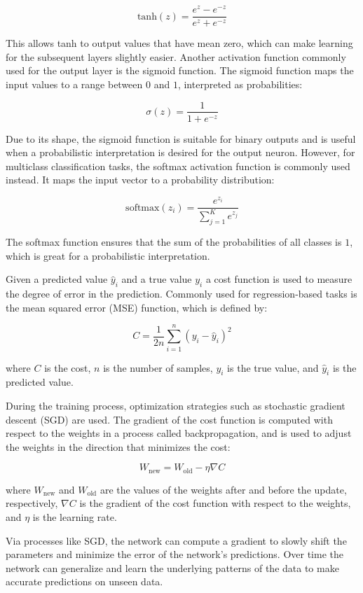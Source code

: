 \documentclass[11pt]{article}
\begin{document}
\[
\text{tanh}(z) = \frac{e^{z} - e^{-z}}{e^{z} + e^{-z}}
\]

This allows tanh to output values that have mean zero, which can make learning for the subsequent layers slightly easier. Another activation function commonly used for the output layer is the sigmoid function. The sigmoid function maps the input values to a range between \(0\) and \(1\), interpreted as probabilities:

\[
\sigma(z) = \frac{1}{1 + e^{-z}}
\]

Due to its shape, the sigmoid function is suitable for binary outputs and is useful when a probabilistic interpretation is desired for the output neuron. However, for multiclass classification tasks, the softmax activation function is commonly used instead. It maps the input vector to a probability distribution:

\[
\text{softmax}(z_i) = \frac{e^{z_i}}{\sum_{j=1}^{K} e^{z_j}}
\]

The softmax function ensures that the sum of the probabilities of all classes is \(1\), which is great for a probabilistic interpretation.

Given a predicted value \(\hat{y}_i\) and a true value \(y_i\) a cost function is used to measure the degree of error in the prediction. Commonly used for regression-based tasks is the mean squared error (MSE) function, which is defined by:

\[ C = \frac{1}{2n} \sum_{i=1}^{n} (y_i - \hat{y}_i)^2 \]

where \(C\) is the cost, \(n\) is the number of samples, \(y_i\) is the true value, and \(\hat{y}_i\) is the predicted value.

During the training process, optimization strategies such as stochastic gradient descent (SGD) are used. The gradient of the cost function is computed with respect to the weights in a process called backpropagation, and is used to adjust the weights in the direction that minimizes the cost:

\[ W_{\text{new}} = W_{\text{old}} - \eta \nabla C \]

where \(W_{\text{new}}\) and \(W_{\text{old}}\) are the values of the weights after and before the update, respectively, \(\nabla C\) is the gradient of the cost function with respect to the weights, and \(\eta\) is the learning rate.

Via processes like SGD, the network can compute a gradient to slowly shift the parameters and minimize the error of the network's predictions. Over time the network can generalize and learn the underlying patterns of the data to make accurate predictions on unseen data.
\end{document}
